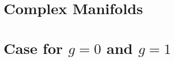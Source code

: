\documentclass[a4paper, 8pt, notitlepage]{extreport}
\begin{document}
    

    \chapter{Complex Manifolds}
    
    

    \chapter{Case for $g=0$ and $g=1$}

    \printbibliography
\end{document}
